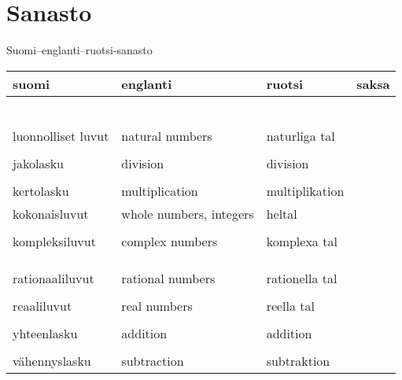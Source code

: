 \chapter{Sanasto}

Suomi–englanti–ruotsi-sanasto

\begin{tabular}{| l | l | l | l |}
	\textbf{suomi} & \textbf{englanti} & \textbf{ruotsi} & \textbf{saksa} \\
		\hline
	
	\\	
\\
\\
\\
\\	
	\\
	luonnolliset luvut & natural numbers & naturliga tal &  \\
\\
jakolasku & division & division & \\	
	\\	
	kertolasku & multiplication & multiplikation & \\
	
	kokonaisluvut & whole numbers, integers & heltal & \\
	\\
kompleksiluvut & complex numbers & komplexa tal & \\
\\
\\
\\	
	rationaaliluvut & rational numbers & rationella tal & \\
	\\
	reaaliluvut & real numbers & reella tal &\\
	\\
	yhteenlasku & addition & addition & \\	
	\\
	vähennyslasku & subtraction & subtraktion &
	\\
\end{tabular}


